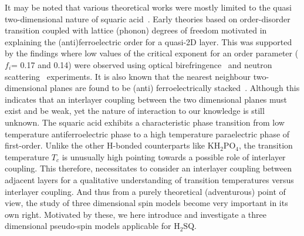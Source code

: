 \indent It may be noted that various theoretical works were mostly limited to the quasi two-dimensional nature of squaric acid~\cite{ishizuka2011quantum,chern2014gauge,vijigiri2018classical,huang2017deconfinement,ishibashi2018computational,matsushita1982cluster}. Early theories based on order-disorder transition coupled with lattice (phonon) degrees of freedom motivated in explaining the (anti)ferroelectric order for a quasi-2D layer. This was supported by the findings where low values of the critical exponent for an order parameter ($f_i$= 0.17 and 0.14) were observed using optical birefringence~\cite{semmingsen1974structural} and  neutron scattering~\cite{WANGY1974} experiments. It is also known that the nearest neighbour two-dimensional planes are found to be (anti) ferroelectrically stacked~\cite{hollander1977molecular}. Although this indicates that an interlayer coupling between the two dimensional planes must exist and be weak, yet the nature of interaction to our knowledge is still unknown.  The squaric acid exhibits a characteristic phase transition from low temperature antiferroelectric phase to a high temperature paraelectric phase of first-order. Unlike the other H-bonded counterparts like $\text{KH}_2\text{PO}_4$, the transition temperature $T_c$ is unusually high pointing towards a possible role of interlayer coupling. This therefore, necessitates to consider an interlayer coupling  between adjacent layers for a qualitative understanding of transition temperatures versus interlayer coupling. And thus from a purely theoretical (adventurous) point of view, the study of three dimensional spin models become very important in its own right. Motivated by these, we here introduce and investigate a three dimensional pseudo-spin models applicable for $\text{H}_2\text{SQ}$. \\
